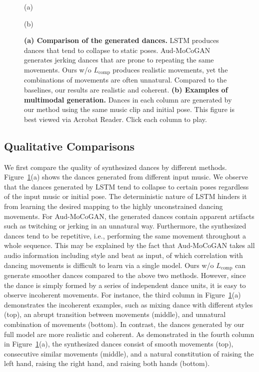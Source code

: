 \documentclass{article}
\newlength\figmargin
\newlength\secmargin
\newlength\subsecmargin
\newcommand{\figref}[1]{Figure~\ref{fig:#1}}
\begin{document}
\begin{figure}
    \begin{minipage}[t]{.49\textwidth}
    \centering
    (a)
    \end{minipage}
    \begin{minipage}[t]{.49\textwidth}
    \centering
    (b)
    \end{minipage}
    \caption{
    \textbf{(a) Comparison of the generated dances.}
LSTM produces dances that tend to collapse to static poses.
Aud-MoCoGAN generates jerking dances that are prone to repeating the same movements.
Ours w/o $L_{\mathrm{comp}}$ produces realistic movements, yet the combinations of movements are often unnatural.
Compared to the baselines, our results are realistic and coherent.
\textbf{(b) Examples of multimodal generation.}
Dances in each column are generated by our method using the same music clip and initial pose.
This figure is best viewed via Acrobat Reader. Click each column to play. 
    }
    \label{fig:compare}
    \vspace{\figmargin}
     \vspace{-2mm}
\end{figure}


\vspace{\subsecmargin}
\subsection{Qualitative Comparisons}
\label{subsec:qual}
\vspace{\subsecmargin}
We first compare the quality of synthesized dances by different methods.
\figref{compare}(a) shows the dances generated from different input music.
We observe that the dances generated by LSTM tend to collapse to certain poses regardless of the input music or initial pose.
The deterministic nature of LSTM hinders it from learning the desired mapping to the highly unconstrained dancing movements.
For Aud-MoCoGAN, the generated dances contain apparent artifacts such as twitching or jerking in an unnatural way.
Furthermore, the synthesized dances tend to be repetitive, i.e., performing the same movement throughout a whole sequence.
This may be explained by the fact that Aud-MoCoGAN takes all audio information including style and beat as input, of which correlation with dancing movements is difficult to learn via a single model.
Ours w/o $L_{\mathrm{comp}}$ can generate smoother dances compared to the above two methods.
However, since the dance is simply formed by a series of independent dance units, it is easy to observe incoherent movements.
For instance, the third column in \figref{compare}(a) demonstrates the incoherent examples, such as mixing dance with different styles (top), an abrupt transition between movements (middle), and unnatural combination of movements (bottom).
In contrast, the dances generated by our full model are more realistic and coherent.
As demonstrated in the fourth column in \figref{compare}(a), the synthesized dances consist of smooth movements (top), consecutive similar movements (middle), and a natural constitution of raising the left hand, raising the right hand, and raising both hands (bottom).
\end{document}
